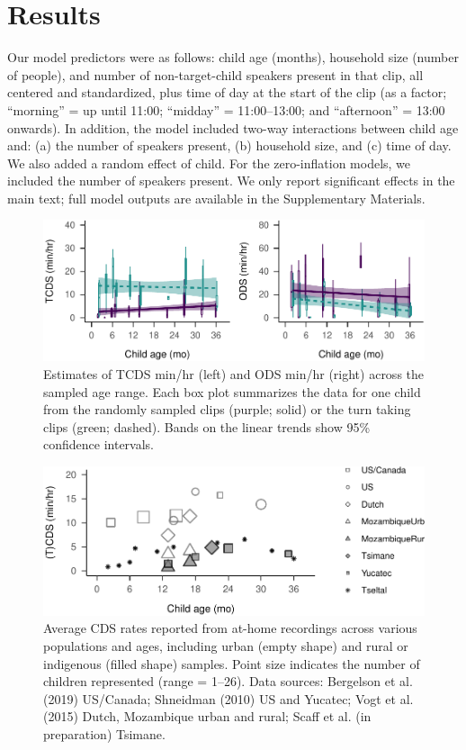 \documentclass[,man,floatsintext]{apa6}
\begin{document}
\section{Results}\label{results}

Our model predictors were as follows: child age (months), household size
(number of people), and number of non-target-child speakers present in
that clip, all centered and standardized, plus time of day at the start
of the clip (as a factor; \enquote{morning} = up until 11:00;
\enquote{midday} = 11:00--13:00; and \enquote{afternoon} = 13:00
onwards). In addition, the model included two-way interactions between
child age and: (a) the number of speakers present, (b) household size,
and (c) time of day. We also added a random effect of child. For the
zero-inflation models, we included the number of speakers present. We
only report significant effects in the main text; full model outputs are
available in the Supplementary Materials.

\begin{figure}
\centering
\includegraphics{Tseltal-CLE_files/figure-latex/fig3-1.pdf}
\caption{\label{fig:fig3}Estimates of TCDS min/hr (left) and ODS min/hr
(right) across the sampled age range. Each box plot summarizes the data
for one child from the randomly sampled clips (purple; solid) or the
turn taking clips (green; dashed). Bands on the linear trends show 95\%
confidence intervals.}
\end{figure}

\begin{figure}
\centering
\includegraphics{Tseltal-CLE_files/figure-latex/fig4-1.pdf}
\caption{\label{fig:fig4}Average CDS rates reported from at-home recordings
across various populations and ages, including urban (empty shape) and
rural or indigenous (filled shape) samples. Point size indicates the
number of children represented (range = 1--26). Data sources: Bergelson
et al. (2019) US/Canada; Shneidman (2010) US and Yucatec; Vogt et al.
(2015) Dutch, Mozambique urban and rural; Scaff et al. (in preparation)
Tsimane.}
\end{figure}
\end{document}
